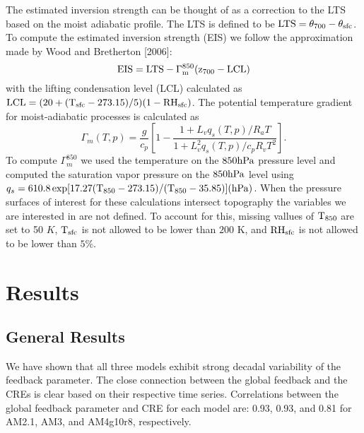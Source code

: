 \documentclass[grl]{agutex2015}
\begin{document}
\begin{article}
            The estimated inversion strength can be thought of as a correction to the LTS based on the moist adiabatic profile.  The LTS is defined to be $\rm{LTS}=\theta_{700}-\theta_{sfc}$.  
            To compute the estimated inversion strength (EIS) we follow the approximation made by Wood and Bretherton [2006]: 
            \begin{equation}
              \rm{EIS} = \rm{LTS} - \Gamma^{850}_m (z_{700}-\rm{LCL})
            \end{equation}
            with the lifting condensation level (LCL) calculated as $\rm{LCL}=(20+(T_{sfc}-273.15)/5)(1-RH_{sfc})$.
            The potential temperature gradient for moist-adiabatic processes is calculated as
            \begin{equation}
              \Gamma_m(T,p)=\frac{g}{c_p} \left[ 1-\frac{1+L_v q_s(T,p)/R_a T}{1+L^2_v q_s(T,p)/c_p R_v T^2} \right].
            \end{equation}
            To compute $\Gamma^{850}_m$ we used the temperature on the $850 \rm{hPa}$ pressure level and computed the saturation vapor pressure on the 
            $850 \rm{hPa}$ level using $q_s=610.8 \, \rm{exp}[17.27(T_{850}-273.15)/(T_{850}-35.85)] (\rm{hPa})$.  When the pressure surfaces of interest for these calculations intersect topography 
            the variables we are interested in are not defined.  To account for this, missing vallues of $\rm{T}_{850}$ are set to 50 $K$, $\rm{T}_{sfc}$ is not allowed to be lower than $200$ K, and $\rm{RH}_{sfc}$
            is not allowed to be lower than $5 \%$.            
     

\section{Results}

\subsection{General Results}
    
We have shown that all three models exhibit strong decadal variability of the feedback parameter.  The close connection between the global feedback and the CREs is clear based on their respective time series.  Correlations between the global feedback parameter and CRE for each model are: 0.93, 0.93, and 0.81 for AM2.1, AM3, and AM4g10r8, respectively.


\end{article}
\end{document}
